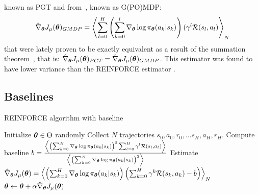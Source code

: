 known as PGT and from~\cite{DBLP:journals/corr/abs-1106-0665}, known as G(PO)MDP:
\[
\hat{\nabla}_{{\boldsymbol{\theta}}}J_\mu({\boldsymbol{\theta}})_{GMDP} = \left\langle \sum_{l=0}^H \left( \sum_{k=0}^{l} \nabla_{{\boldsymbol{\theta}}}\log\pi_{{\boldsymbol{\theta}}}(a_k|s_k) \right) (\gamma^{l}\mathcal{R}(s_l,a_l) \right\rangle_{N}
\]
that were lately proven to be exactly equivalent as a result of the summation theorem~\cite{rade2000springers}, that is: $\hat{\nabla}_{{\boldsymbol{\theta}}}J_\mu({\boldsymbol{\theta}})_{PGT} = \hat{\nabla}_{{\boldsymbol{\theta}}}J_\mu({\boldsymbol{\theta}})_{GMDP}$.
This estimator was found to have lower variance than the REINFORCE estimator \cite{DBLP:journals/corr/abs-1106-0665}.

\subsection{Baselines}
\begin{algorithm}[t]
\caption{REINFORCE algorithm with baseline}
\label{alg:reinforce-baseline}
\begin{algorithmic}
\State Initialize ${\boldsymbol{\theta}} \in \Theta$ randomly
\State Collect $N$ trajectories $s_0,a_0,r_0,\ldots s_H,a_H,r_H$.
\State Compute baseline $b = \frac{\left\langle \left(\sum_{k=0}^H \nabla_{{\boldsymbol{\theta}}}\log\pi_{{\boldsymbol{\theta}}}(a_k|s_k) \right)^2\sum_{l=0}^{H}\gamma^l\mathcal{R}(s_l,a_l) \right\rangle}{\left\langle \left( \sum_{k=0}^H \nabla_{{\boldsymbol{\theta}}}\log\pi_{{\boldsymbol{\theta}}}(a_k|s_k) \right)^2 \right\rangle}$
\State Estimate $\hat{\nabla}_{{\boldsymbol{\theta}}}J_\mu({\boldsymbol{\theta}}) = \left\langle \left(\sum_{k=0}^{H} \nabla_{{\boldsymbol{\theta}}}\log\pi_{{\boldsymbol{\theta}}}(a_k|s_k)  \right)\left(\sum_{k=0}^H \gamma^k\mathcal{R}(s_k,a_k) - b\right) \right\rangle_{N}$
\State ${\boldsymbol{\theta}} \gets {\boldsymbol{\theta}} + \alpha\hat{\nabla}_{{\boldsymbol{\theta}}}J_{\mu}({\boldsymbol{\theta}})$
\EndFor
\end{algorithmic}
\end{algorithm}

